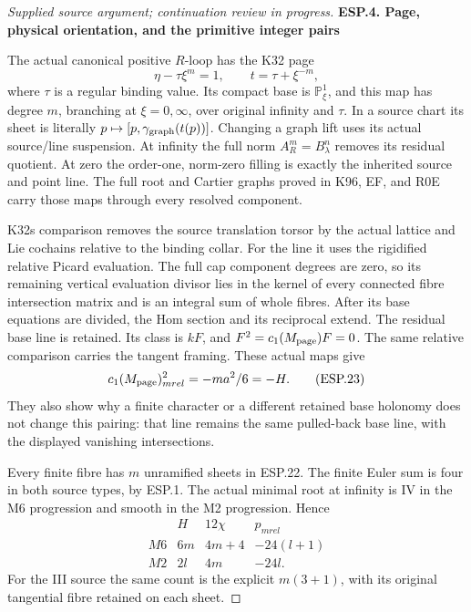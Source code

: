 \begin{proof}[Supplied source argument; continuation review in progress]
\par

\medskip\noindent\textbf{ESP.4. Page, physical orientation, and the primitive integer pairs}

\par\nobreak

The actual canonical positive \(R\)-loop has the K32 page
\[
                   \eta-\tau\xi^m=1,
                   \qquad t=\tau+\xi^{-m},
 \tag{ESP.22}
\]
where \(\tau\) is a regular binding value. Its compact base is
\(\mathbb P^1_\xi\), and this map has degree \(m\), branching at
\(\xi=0,\infty\), over original infinity and \(\tau\). In a
source chart its sheet is literally
\(p\mapsto[p,\gamma_{\rm graph}(t(p))]\). Changing a graph lift
uses its actual source/line suspension. At infinity the full norm
\(A_R^m=B_\lambda^n\) removes its residual quotient. At zero the
order-one, norm-zero filling is exactly the inherited source and
point line. The full root and Cartier graphs proved in K96, EF,
and R0E carry those maps through every resolved component.

K32\textquotesingle s comparison removes the source translation torsor by the
actual lattice and Lie cochains relative to the binding collar.
For the line it uses the rigidified relative Picard evaluation. The
full cap component degrees are zero, so its remaining vertical
evaluation divisor lies in the kernel of every connected fibre
intersection matrix and is an integral sum of whole fibres. After
its base equations are divided, the Hom section and its reciprocal
extend. The residual base line is retained. Its class is \(kF\),
and \(F^2=c_1(M_{\rm page})F=0\). The same relative comparison
carries the tangent framing. These actual maps give
\[
                 c_1(M_{\rm page})_{
m rel}^2
                       =-ma^2/6=-H.
 \tag{ESP.23}
\]
They also show why a finite character or a different retained base
holonomy does not change this pairing: that line remains the same
pulled-back base line, with the displayed vanishing intersections.

Every finite fibre has \(m\) unramified sheets in ESP.22. The finite
Euler sum is four in both source types, by ESP.1. The actual minimal
root at infinity is IV in the M6 progression and smooth in the M2
progression. Hence
\[
 \begin{array}{c|c|c|c}
 &H&12\chi&p_{
m rel}\\\hline
 M6&6m&4m+4&-24(l+1)\\
 M2&2l&4m&-24l.
 \end{array}
 \tag{ESP.24}
\]
For the III source the same count is the explicit \(m(3+1)\),
with its original tangential fibre retained on each sheet.


\end{proof}
